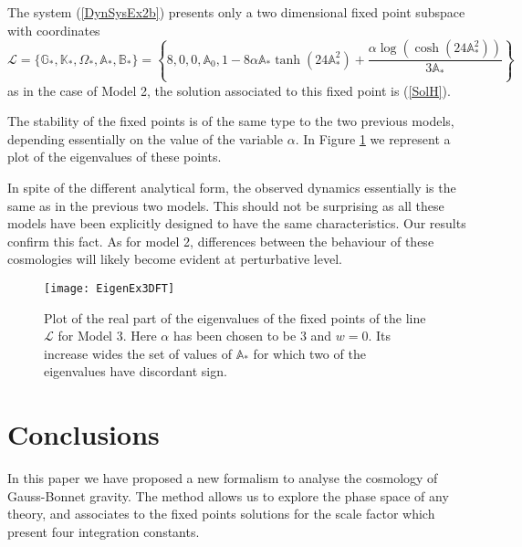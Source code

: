 \documentclass[a4paper,aps,onecolumn,nofootinbib]{revtex4}
\def\rf#1{(\ref{#1})}
\newcommand{\A}{\mathbb{A}}
\begin{document}
The system \rf{DynSysEx2b} presents only a two dimensional fixed point subspace with coordinates
\begin{equation}
\mathcal{L}=\{\mathbb{G}_*,\mathbb{K}_*,\Omega_*, \A_*, \mathbb{B}_*\}=\left\{8,0,0, \A_0, 1-8 \alpha\mathbb{A}_* \tanh \left(24 \mathbb{A}_*^2\right)+\frac{\alpha  \log \left(\cosh \left(24
   \mathbb{A}_*^2\right)\right)}{3 \mathbb{A}_*}\right\}
\end{equation}
as in the case of Model 2, the solution associated to this fixed point is  \rf{SolH}.

The stability of the fixed points is of the same type to the two previous models, depending essentially on the value of the variable $\alpha$. In Figure \ref{EigenEx3DFT} we  
 represent a plot of the eigenvalues of these points.

In spite of the different analytical  form, the  observed dynamics essentially is  the same as  in the previous two models. This should not be surprising as all these models have been explicitly designed to have the same characteristics. Our results confirm this fact. As for  model 2, differences between the behaviour of these cosmologies will likely become evident at perturbative level.
\begin{figure}[htbp]
\begin{center}
\texttt{[image: EigenEx3DFT]}
\caption{Plot of the real part of the eigenvalues of the fixed points of the line $\mathcal{L}$ for Model 3. Here $\alpha$ has been chosen to be $3$ and $w=0$. Its increase wides the set of values of $\mathbb{A}_*$ for which two of the eigenvalues have discordant sign.}
\label{EigenEx3DFT}
\end{center}
\end{figure}


\section{Conclusions}
In this paper we have proposed a new formalism to analyse the cosmology of Gauss-Bonnet  gravity. The method allows us to explore the phase space of any theory, and associates to the fixed points solutions for the scale factor  which present four integration constants. 
\end{document}
